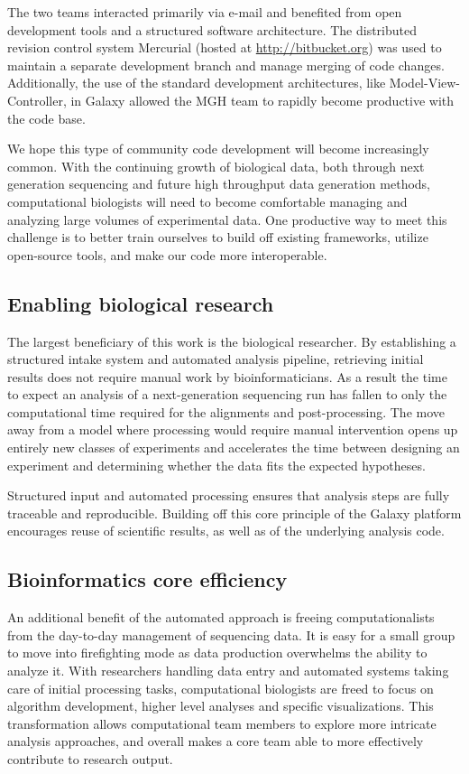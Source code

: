 \documentclass[10pt]{bmc_article}
\newenvironment{bmcformat}{\begin{raggedright}\baselineskip20pt\sloppy\setboolean{publ}{false}}{\end{raggedright}\baselineskip20pt\sloppy}
\begin{document}
\begin{bmcformat}
The two teams interacted primarily via e-mail and benefited from open
development tools and a structured software architecture. The
distributed revision control system Mercurial (hosted at
\url{http://bitbucket.org}) was used to maintain a separate development
branch and manage merging of code changes. Additionally, the use of
the standard development architectures, like Model-View-Controller,
in Galaxy allowed the MGH team to rapidly become productive with
the code base.

We hope this type of community code development will become
increasingly common. With the continuing growth of biological data,
both through next generation sequencing and future high throughput
data generation methods, computational biologists will need to become
comfortable managing and analyzing large volumes of experimental
data. One productive way to meet this challenge is to better train
ourselves to build off existing frameworks, utilize open-source tools,
and make our code more interoperable.

\subsection*{Enabling biological research}

The largest beneficiary of this work is the biological
researcher. By establishing a structured intake
system and automated analysis pipeline, retrieving initial results
does not require manual work by bioinformaticians. As a result
the time to expect an analysis of a next-generation sequencing run has
fallen to only the computational time required for the alignments and
post-processing. The move away from a model where processing would
require manual intervention opens up entirely new classes of
experiments and accelerates the time between designing an experiment
and determining whether the data fits the expected hypotheses.

Structured input and automated processing ensures that analysis steps
are fully traceable and reproducible. Building off this core principle
of the Galaxy platform encourages reuse of scientific results, as well
as of the underlying analysis code.

\subsection*{Bioinformatics core efficiency}

An additional benefit of the automated approach is freeing
computationalists from the day-to-day management of
sequencing data. It is easy for a small group to move into
firefighting mode as data production overwhelms the ability to
analyze it. With researchers handling data entry and automated systems
taking care of initial processing tasks, computational biologists are
freed to focus on algorithm development, higher level analyses and
specific visualizations. This transformation allows computational team
members to explore more intricate analysis approaches, and overall
makes a core team able to more effectively contribute to research
output.


\end{bmcformat}
\end{document}
